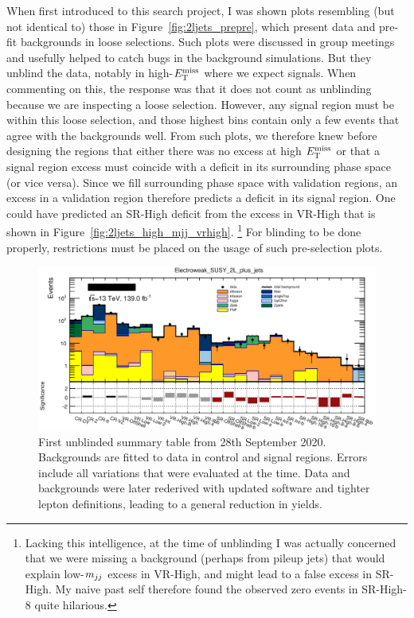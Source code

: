 When first introduced to this search project, I was shown plots resembling
(but not identical to) those in Figure~\ref{fig:2ljets_prepre}, which present
data and pre-fit backgrounds in loose selections.
Such plots were discussed in group meetings and usefully helped to catch bugs
in the background simulations.
But they unblind the data, notably in high-$E_\mathrm{T}^\mathrm{miss}$ where we expect signals.
When commenting on this, the response was that it does not count as unblinding
because we are inspecting a loose selection.
However, any signal region must be within this loose selection, and those
highest bins contain only a few events that agree with the backgrounds well.
From such plots, we therefore knew before designing the regions that either
there was no excess at high $E_\mathrm{T}^\mathrm{miss}$ or that a signal region excess must
coincide with a deficit in its surrounding phase space (or vice versa).
Since we fill surrounding phase space with validation regions, an excess in a
validation region therefore predicts a deficit in its signal region.
One could have predicted an SR-High deficit from the excess in VR-High
that is shown in Figure~\ref{fig:2ljets_high_mjj_vrhigh}.%
\footnote{%
Lacking this intelligence, at the time of unblinding I was actually concerned
that we were missing a background (perhaps from pileup jets) that would
explain low-$m_{jj}$ excess in VR-High, and might lead to a false excess
in SR-High.
My naive past self therefore found the observed zero events in SR-High-8
quite hilarious.
}
For blinding to be done properly, restrictions must be placed on the usage of
such pre-selection plots.

\begin{figure}[tp]
\centering
\includegraphics[width=\textwidth]{figures/2ljets_summary_unblinding_log.png}
\caption[
First unblinded summary table from 28th September 2020
]{%
First unblinded summary table from 28th September 2020.
Backgrounds are fitted to data in control and signal regions.
Errors include all variations that were evaluated at the time.
Data and backgrounds were later rederived with updated software and tighter
lepton definitions, leading to a general reduction in yields.
}
\label{fig:2ljets_summary_unblinding}
\end{figure}

